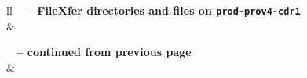 \documentclass[12pt,letterpaper,dvips]{article}
\begin{document}
\begin{longtable}[l]{ll}
    {{\bfseries \tablename\ \thetable{} -- FileXfer directories and files on \texttt{prod-prov4-cdr1}}} \\
    \hline
     &
    \\
    \hline
\endfirsthead

%
{{\bfseries \tablename\ \thetable{} -- continued from previous page}} \\
\hline
{} &
 \\ \hline 
\endhead

\hline {} \\ \hline
\endfoot

\endlastfoot


\end{longtable}
\end{document}
